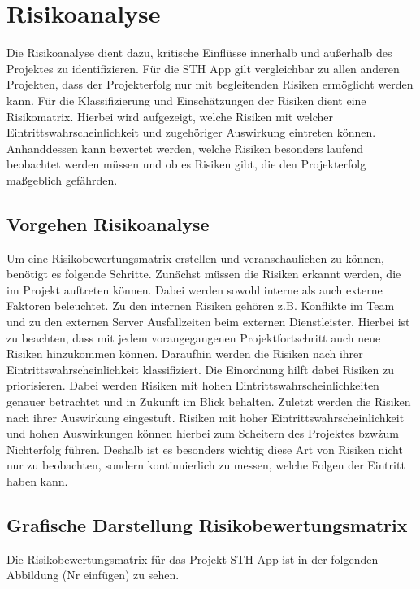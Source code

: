 \chapter{Risikoanalyse}

Die Risikoanalyse dient dazu, kritische Einflüsse innerhalb und außerhalb des Projektes zu identifizieren.
Für die STH App gilt vergleichbar zu allen anderen Projekten, dass der Projekterfolg nur mit begleitenden Risiken ermöglicht werden kann.
Für die Klassifizierung und Einschätzungen der Risiken dient eine Risikomatrix. Hierbei wird aufgezeigt, welche Risiken mit welcher Eintrittswahrscheinlichkeit und zugehöriger Auswirkung eintreten können.
Anhanddessen kann bewertet werden, welche Risiken besonders laufend beobachtet werden müssen und ob es Risiken gibt, die den Projekterfolg maßgeblich gefährden.

\section{Vorgehen Risikoanalyse}
Um eine Risikobewertungsmatrix erstellen und veranschaulichen zu können, benötigt es folgende Schritte.
Zunächst müssen die Risiken erkannt werden, die im Projekt auftreten können.
Dabei werden sowohl interne als auch externe Faktoren beleuchtet.
Zu den internen Risiken gehören z.B. Konflikte im Team und zu den externen Server Ausfallzeiten beim externen Dienstleister.
Hierbei ist zu beachten, dass mit jedem vorangegangenen Projektfortschritt auch neue Risiken hinzukommen können.
Daraufhin werden die Risiken nach ihrer Eintrittswahrscheinlichkeit klassifiziert.
Die Einordnung hilft dabei Risiken zu priorisieren.
Dabei werden Risiken mit hohen Eintrittswahrscheinlichkeiten genauer betrachtet und in Zukunft im Blick behalten.
Zuletzt werden die Risiken nach ihrer Auswirkung eingestuft.
Risiken mit hoher Eintrittswahrscheinlichkeit und hohen Auswirkungen können hierbei zum Scheitern des Projektes bzw\. zum Nichterfolg führen.
Deshalb ist es besonders wichtig diese Art von Risiken nicht nur zu beobachten, sondern kontinuierlich zu messen, welche Folgen der Eintritt haben kann.

\section{Grafische Darstellung Risikobewertungsmatrix}
Die Risikobewertungsmatrix für das Projekt STH App ist in der folgenden Abbildung (Nr einfügen) zu sehen.

